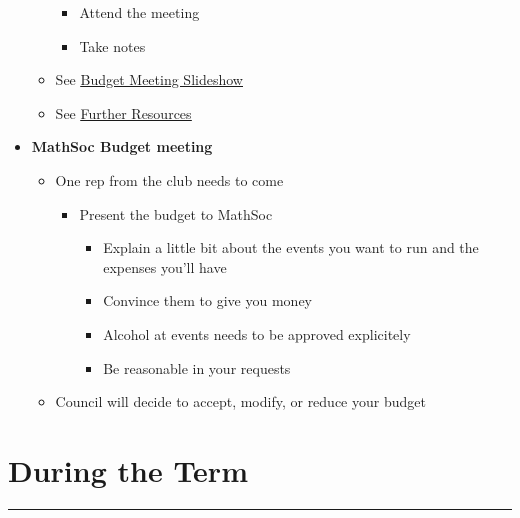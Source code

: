 \documentclass[utf8]{article}
\newcommand{\budgetSlideshow}{\href{https://docs.google.com/presentation/d/1STBZmvycCzdxlngaaHDIre7LndTr-057gBXYInwFuVg/edit?usp=sharing}{\underline{Budget Meeting Slideshow} }}
\renewcommand{\labelitemi}{$\square$}
\renewcommand\labelitemii{\textbullet}
\renewcommand\labelitemiii{$\square$}
\newcommand{\otherresources}{\hyperref[sec:otherresources]{\underline{Further Resources}}}
\begin{document}
\begin{itemize}
\begin{itemize}
\begin{itemize}
            \item Attend the meeting 
            \item Take notes
        \end{itemize}
        \item See \budgetSlideshow
        \item See \otherresources
    \end{itemize}
    \item \textbf{MathSoc Budget meeting}
    \begin{itemize}
        \item One rep from the club needs to come
        \begin{itemize}
            \item Present the budget to MathSoc
            \begin{itemize}
                \item Explain a little bit about the events you want to run and the expenses you’ll have
                \item Convince them to give you money
                \item Alcohol at events needs to be approved explicitely
                \item Be reasonable in your requests
            \end{itemize}
        \end{itemize}
        \item Council will decide to accept, modify, or reduce your budget
    \end{itemize}
\end{itemize}

\renewcommand{\labelitemi}{\textbullet}
\renewcommand\labelitemii{$\square$}
\renewcommand\labelitemiii{\textbullet}

\section*{During the Term}
\par\rule{\textwidth}{0.4pt}\\
\end{document}
